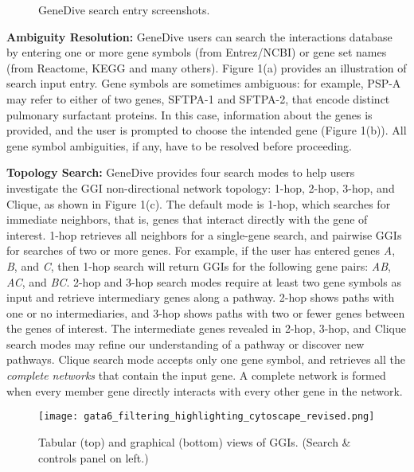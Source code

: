 \documentclass{ws-procs11x85}
\begin{document}
\begin{figure}
\centering
{}\quad
{}\quad
{}
\caption{GeneDive search entry screenshots.}
\label{fig:search}
\end{figure}

\noindent \textbf{Ambiguity Resolution:} GeneDive users can search the interactions database by entering one or more gene symbols (from Entrez/NCBI) or gene set names (from Reactome, KEGG and many others). Figure 1(a) provides an illustration of search input entry. Gene symbols are sometimes ambiguous: for example, PSP-A may refer to either of two genes, SFTPA-1 and SFTPA-2, that encode distinct pulmonary surfactant proteins. In this case, information about the genes is provided, and the user is prompted to choose the intended gene (Figure 1(b)). All gene symbol ambiguities, if any, have to be resolved before proceeding. \newline

\noindent \textbf{Topology Search:} GeneDive provides four search modes to help users investigate the GGI non-directional network topology: 1-hop, 2-hop, 3-hop, and Clique, as shown in Figure 1(c). The default mode is 1-hop, which searches for immediate neighbors, that is, genes that interact directly with the gene of interest. 1-hop retrieves all neighbors for a single-gene search, and pairwise GGIs for searches of two or more genes. For example, if the user has entered genes \emph{A}, \emph{B}, and \emph{C}, then 1-hop search will return GGIs for the following gene pairs: \emph{AB}, \emph{AC}, and \emph{BC}. 2-hop and 3-hop search modes require at least two gene symbols as input and retrieve intermediary genes along a pathway. 2-hop shows paths with one or no intermediaries, and 3-hop shows paths with two or fewer genes between the genes of interest. The intermediate genes revealed in 2-hop, 3-hop, and Clique search modes may refine our understanding of a pathway or discover new pathways. Clique search mode accepts only one gene symbol, and retrieves all the \emph{complete networks} that contain the input gene. A complete network is formed when every member gene directly interacts with every other gene in the network. 

\begin{figure}
\centerline{
    \texttt{[image: gata6\_filtering\_highlighting\_cytoscape\_revised.png]}
}
\caption{Tabular (top) and graphical (bottom) views of GGIs. (Search \& controls panel on left.)}
\label{fig:results}
\end{figure}
\end{document}
